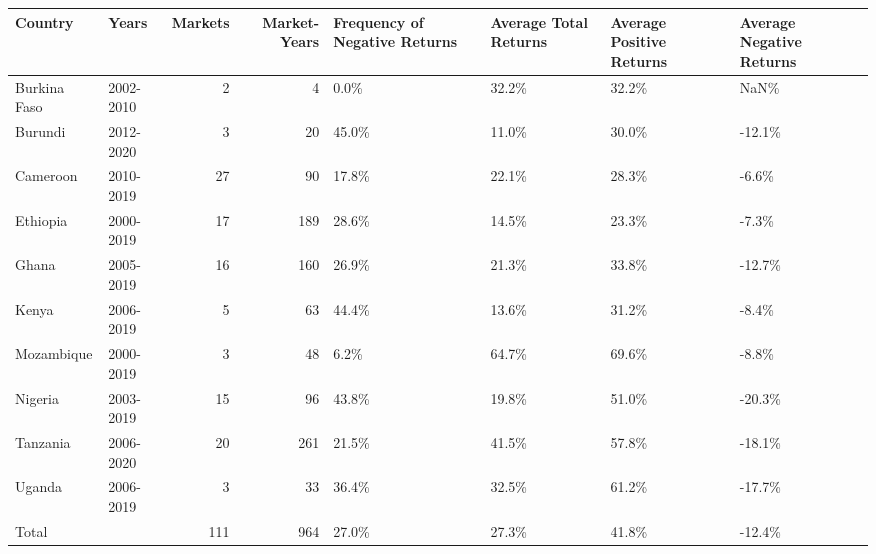 \begin{table}[ht]
\centering
\begin{tabular}{llrrllll}
  \hline
Country & Years & Markets & Market-Years & Frequency of Negative Returns & Average Total Returns & Average Positive Returns & Average Negative Returns \\ 
  \hline
Burkina Faso & 2002-2010 &   2 &   4 & 0.0\% & 32.2\% & 32.2\% & NaN\% \\ 
  Burundi & 2012-2020 &   3 &  20 & 45.0\% & 11.0\% & 30.0\% & -12.1\% \\ 
  Cameroon & 2010-2019 &  27 &  90 & 17.8\% & 22.1\% & 28.3\% & -6.6\% \\ 
  Ethiopia & 2000-2019 &  17 & 189 & 28.6\% & 14.5\% & 23.3\% & -7.3\% \\ 
  Ghana & 2005-2019 &  16 & 160 & 26.9\% & 21.3\% & 33.8\% & -12.7\% \\ 
  Kenya & 2006-2019 &   5 &  63 & 44.4\% & 13.6\% & 31.2\% & -8.4\% \\ 
  Mozambique & 2000-2019 &   3 &  48 & 6.2\% & 64.7\% & 69.6\% & -8.8\% \\ 
  Nigeria & 2003-2019 &  15 &  96 & 43.8\% & 19.8\% & 51.0\% & -20.3\% \\ 
  Tanzania & 2006-2020 &  20 & 261 & 21.5\% & 41.5\% & 57.8\% & -18.1\% \\ 
  Uganda & 2006-2019 &   3 &  33 & 36.4\% & 32.5\% & 61.2\% & -17.7\% \\ 
  Total &   & 111 & 964 & 27.0\% & 27.3\% & 41.8\% & -12.4\% \\ 
   \hline
\end{tabular}
\end{table}
